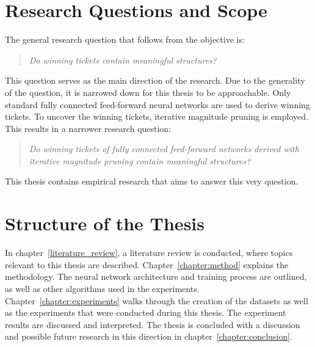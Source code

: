\section{Research Questions and Scope}
The general research question that follows from the objective is: 
\begin{quote}
\textit{Do winning tickets contain meaningful structures?}
\end{quote}
This question serves as the main direction of the research.
Due to the generality of the question, it is narrowed down for this thesis to be approachable.
Only standard fully connected feed-forward neural networks are used to derive winning tickets.
To uncover the winning tickets, iterative magnitude pruning is employed.
This results in a narrower research question:
\begin{quote}
\textit{Do winning tickets of fully connected feed-forward networks derived with iterative magnitude pruning contain meaningful structures?}
\end{quote}
This thesis contains empirical research that aims to answer this very question.


\section{Structure of the Thesis}
In chapter~\ref{literature_review}, a literature review is conducted, where topics relevant to this thesis are described.
Chapter~\ref{chapter:method} explains the methodology.
The neural network architecture and training process are outlined, as well as other algorithms used in the experiments.
Chapter~\ref{chapter:experiments} walks through the creation of the datasets as well as the experiments that were conducted during this thesis.
The experiment results are discussed and interpreted.
The thesis is concluded with a discussion and possible future research in this direction in chapter~\ref{chapter:conclusion}.